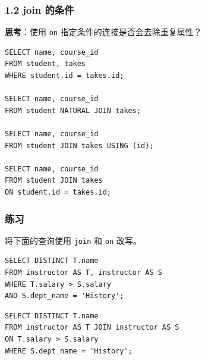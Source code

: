 \documentclass[aspectratio=169, 14pt]{beamer}
\begin{document}
\begin{frame}[fragile]
    \frametitle{1.2 join 的条件}


{\large {}}  \textbf{思考}：使用 \texttt{on} 指定条件的连接是否会去除重复属性？

\end{frame}

\begin{frame}[fragile]
    \begin{verbatim}
SELECT name, course_id
FROM student, takes
WHERE student.id = takes.id;

SELECT name, course_id
FROM student NATURAL JOIN takes;

SELECT name, course_id
FROM student JOIN takes USING (id);

SELECT name, course_id
FROM student JOIN takes
ON student.id = takes.id;
    \end{verbatim}

\end{frame}

\begin{frame}[fragile]
    \frametitle{练习}

    {\large {}} 将下面的查询使用 \texttt{join} 和 \texttt{on} 改写。

\begin{verbatim}
SELECT DISTINCT T.name
FROM instructor AS T, instructor AS S
WHERE T.salary > S.salary
AND S.dept_name = 'History';    
\end{verbatim}

\pause

\begin{verbatim}
SELECT DISTINCT T.name
FROM instructor AS T JOIN instructor AS S
ON T.salary > S.salary
WHERE S.dept_name = 'History';   
\end{verbatim}

\end{frame}
\end{document}
